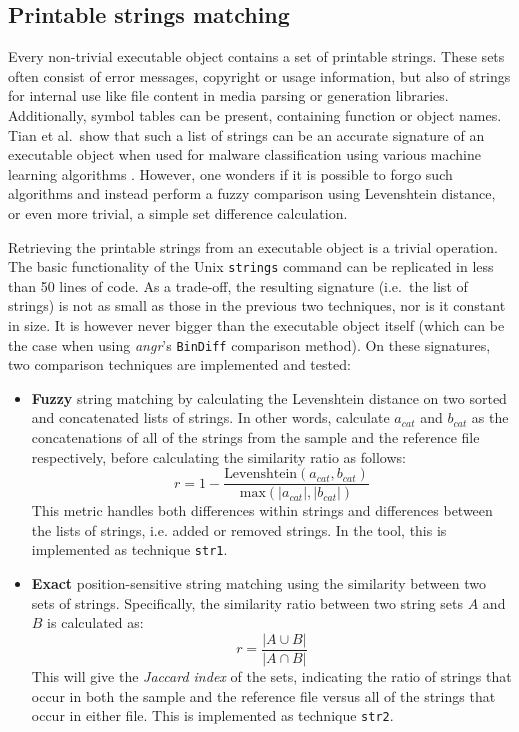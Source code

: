 \documentclass[twocolumn,a4paper]{IEEEtran} %
\begin{document}
\subsection{Printable strings matching}
\label{sec:tech-strings}
Every non-trivial executable object contains a set of printable strings. These sets often consist of error messages, copyright or usage information, but also of strings for internal use like file content in media parsing or generation libraries. Additionally, symbol tables can be present, containing function or object names. Tian et al.\ show that such a list of strings can be an accurate signature of an executable object when used for malware classification using various machine learning algorithms \cite{Tian2009}. However, one wonders if it is possible to forgo such algorithms and instead perform a fuzzy comparison using Levenshtein distance, or even more trivial, a simple set difference calculation.

Retrieving the printable strings from an executable object is a trivial operation. The basic functionality of the Unix \texttt{strings} command can be replicated in less than 50 lines of code. As a trade-off, the resulting signature (i.e.~the list of strings) is not as small as those in the previous two techniques, nor is it constant in size. It is however never bigger than the executable object itself (which can be the case when using \emph{angr}'s \texttt{BinDiff} comparison method). On these signatures, two comparison techniques are implemented and tested:
\begin{itemize}[noitemsep,topsep=0pt,parsep=0pt,partopsep=0pt]
  \item \textbf{Fuzzy} string matching by calculating the Levenshtein distance on two sorted and concatenated lists of strings. In other words, calculate $a_{cat}$ and $b_{cat}$ as the concatenations of all of the strings from the sample and the reference file respectively, before calculating the similarity ratio as follows: $$r = 1 - \frac{\text{Levenshtein}(a_{cat}, b_{cat})}{\text{max}(|a_{cat}|, |b_{cat}|)}$$
  This metric handles both differences within strings and differences between the lists of strings, i.e. added or removed strings. In the tool, this is implemented as technique \texttt{str1}.

  \item \textbf{Exact} position-sensitive string matching using the similarity between two sets of strings. Specifically, the similarity ratio between two string sets $A$ and $B$ is calculated as:
  $$r = \frac{|A \cup B|}{|A \cap B|} $$ 
  This will give the \emph{Jaccard index} of the sets, indicating the ratio of strings that occur in both the sample and the reference file versus all of the strings that occur in either file. This is implemented as technique \texttt{str2}.
\end{itemize}
\end{document}

